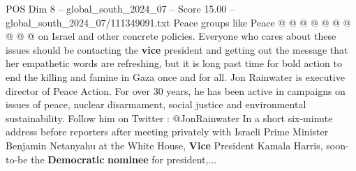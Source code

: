 \begin{textsample}{POS Dim 8 – global\_south\_2024\_07 – Score 15.00 – global\_south\_2024\_07/111349091.txt}
Peace groups like Peace @ @ @ @ @ @ @ @ @ @ on Israel and other concrete policies.
Everyone who cares about these issues should be contacting the \textbf{vice} president and getting out the message that her empathetic words are refreshing, but it is long past time for bold action to end the killing and famine in Gaza once and for all.
Jon Rainwater is executive director of Peace Action.
For over 30 years, he has been active in campaigns on issues of peace, nuclear disarmament, social justice and environmental sustainability.
Follow him on Twitter : @JonRainwater In a short six-minute address before reporters after meeting privately with Israeli Prime Minister Benjamin Netanyahu at the White House, \textbf{Vice} President Kamala Harris, soon-to-be the \textbf{Democratic} \textbf{nominee} for president,...

\end{textsample}
